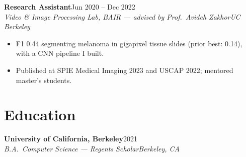 \documentclass[10pt]{article}
\newcommand{\role}[4]{\par\vspace{5pt}\textbf{#1}\hfill#2\\\textit{#3}\hfill\textit{#4}\par}
\begin{document}
\role{Research Assistant}{Jun 2020 -- Dec 2022}{Video \& Image Processing Lab, BAIR --- advised by Prof.\ Avideh Zakhor}{UC Berkeley}
\begin{itemize}
\item F1 0.44 segmenting melanoma in gigapixel tissue slides (prior best: 0.14), with a CNN pipeline I built.
\item Published at SPIE Medical Imaging 2023 and USCAP 2022; mentored master's students.
\end{itemize}


\section*{Education}

\role{University of California, Berkeley}{2021}{B.A.\ Computer Science --- Regents Scholar}{Berkeley, CA}
\end{document}
